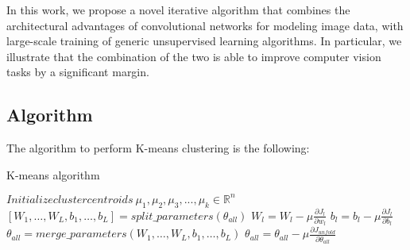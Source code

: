 \documentclass{article}
\begin{document}
In this work, we propose a novel iterative algorithm that combines the
architectural advantages of convolutional networks for modeling image
data, with large-scale training of generic unsupervised learning
algorithms. In particular, we illustrate that the combination of the
two is able to improve computer vision tasks by a significant margin. 

\subsection{Algorithm} 
The algorithm to perform K-means clustering is the following: 

\begin{algorithm} 
\caption{K-means algorithm} 
\label{algo1}
\begin{algorithmic}
\STATE
\STATE $Initialize cluster centroids \: \mu_1, \mu_2, \mu_3, ...,
\mu_k \in \mathbb{R}^n$ 
    \STATE $[W_1, \ldots, W_L, b_1, \ldots, b_L] = split\_parameters(\theta_{all})$
        \STATE $W_l = W_l - \mu \frac{\partial J_l}{\partial w_l}$
        \STATE $b_l = b_l - \mu \frac{\partial J_l}{\partial b_l}$
    \ENDFOR
    \STATE $\theta_{all} = merge\_parameters(W_1, \ldots, W_L, b_1, \ldots, b_L)$
    \STATE $\theta_{all} = \theta_{all} - \mu \frac{\partial J_{unfold}}{\partial \theta_{all}}$
\ENDWHILE
\end{algorithmic} 
\end{algorithm} 

 
 
\end{document}
